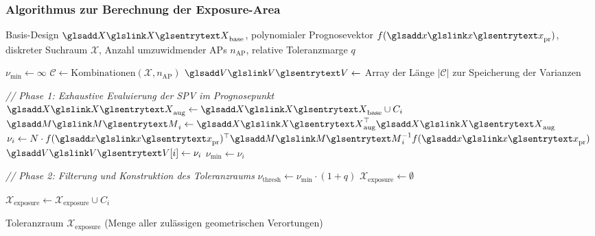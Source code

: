 \subsubsection{Algorithmus zur Berechnung der Exposure-Area}
\begin{algorithm}[htbp]
    \caption{Algorithmische Identifikation der Anker-Exposition (\textit{Exposure-Area})}
    \label{alg:exposure_area}
    \begin{algorithmic}[1]
        \Require Basis-Design $\sym{X}_{\text{base}}$, polynomialer Prognosevektor $f(\sym{x}_{\text{pr}})$,
        diskreter Suchraum $\mathcal{X}$, Anzahl umzuwidmender \acp{AP} $n_{\text{AP}}$, relative Toleranzmarge $q$

        \State $\nu_{\text{min}} \gets \infty$ 
        \State $\mathcal{C} \gets \text{Kombinationen}(\mathcal{X}, n_{\text{AP}})$ 
        \State $\sym{V} \gets$ Array der Länge $|\mathcal{C}|$ zur Speicherung der Varianzen

        \vspace{0.5em}
        \Statex \textit{// Phase 1: Exhaustive Evaluierung der \ac{SPV} im Prognosepunkt}
        \State $\sym{X}_{\text{aug}} \gets \sym{X}_{\text{base}} \cup C_i$ 
        \State $\sym{M}_i \gets \sym{X}_{\text{aug}}^\top \sym{X}_{\text{aug}}$ 
        \State $\nu_i \gets N \cdot f(\sym{x}_{\text{pr}})^\top \sym{M}_i^{-1} f(\sym{x}_{\text{pr}})$ 
        \State $\sym{V}[i] \gets \nu_i$
        \State $\nu_{\text{min}} \gets \nu_i$ 
        \EndIf
        \EndFor

        \vspace{0.5em}
        \Statex \textit{// Phase 2: Filterung und Konstruktion des Toleranzraums}
        \State $\nu_{\text{thresh}} \gets \nu_{\text{min}} \cdot (1 + q)$ 
        \State $\mathcal{X}_{\text{exposure}} \gets \emptyset$

        \State $\mathcal{X}_{\text{exposure}} \gets \mathcal{X}_{\text{exposure}} \cup C_i$ 
        \EndIf
        \EndFor

        \Ensure Toleranzraum $\mathcal{X}_{\text{exposure}}$ (Menge aller zulässigen geometrischen Verortungen)
    \end{algorithmic}
\end{algorithm}


